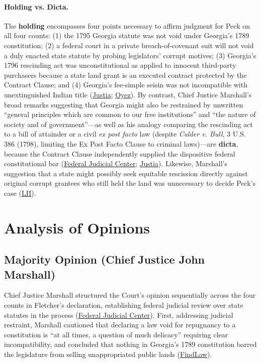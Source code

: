 \documentclass[12pt]{article}
\begin{document}
\paragraph{Holding vs. Dicta.}
The \textbf{holding} encompasses four points necessary to affirm judgment for Peck on all four counts: (1) the 1795 Georgia statute was not void under Georgia's 1789 constitution; (2) a federal court in a private breach-of-covenant suit will not void a duly enacted state statute by probing legislators' corrupt motives; (3) Georgia's 1796 rescinding act was unconstitutional as applied to innocent third-party purchasers because a state land grant is an executed contract protected by the Contract Clause; and (4) Georgia's fee-simple seisin was not incompatible with unextinguished Indian title (\href{https://supreme.justia.com/cases/federal/us/10/87/}{Justia}; \href{https://www.oyez.org/cases/1789-1850/10us87}{Oyez}). By contrast, Chief Justice Marshall's broad remarks suggesting that Georgia might also be restrained by unwritten ``general principles which are common to our free institutions'' and ``the nature of society and of government''---as well as his analogy comparing the rescinding act to a bill of attainder or a civil \textit{ex post facto} law (despite \textit{Calder v. Bull}, 3 U.S. 386 (1798), limiting the Ex Post Facto Clause to criminal laws)---are \textbf{dicta}, because the Contract Clause independently supplied the dispositive federal constitutional bar (\href{https://www.fjc.gov/history/cases/cases-that-shaped-the-federal-courts/fletcher-v-peck}{Federal Judicial Center}; \href{https://supreme.justia.com/cases/federal/us/349/302/}{Justia}). Likewise, Marshall's suggestion that a state might possibly seek equitable rescission directly against original corrupt grantees who still held the land was unnecessary to decide Peck's case (\href{https://www.law.cornell.edu/supremecourt/text/10/87}{LII}).

\section{Analysis of Opinions}

\subsection{Majority Opinion (Chief Justice John Marshall)}

Chief Justice Marshall structured the Court's opinion sequentially across the four counts in Fletcher's declaration, establishing federal judicial review over state statutes in the process (\href{https://www.fjc.gov/history/cases/cases-that-shaped-the-federal-courts/fletcher-v-peck}{Federal Judicial Center}). First, addressing judicial restraint, Marshall cautioned that declaring a law void for repugnancy to a constitution is ``at all times, a question of much delicacy'' requiring clear incompatibility, and concluded that nothing in Georgia's 1789 constitution barred the legislature from selling unappropriated public lands (\href{https://caselaw.findlaw.com/court/us-supreme-court/10/87.html}{FindLaw}).
\end{document}
